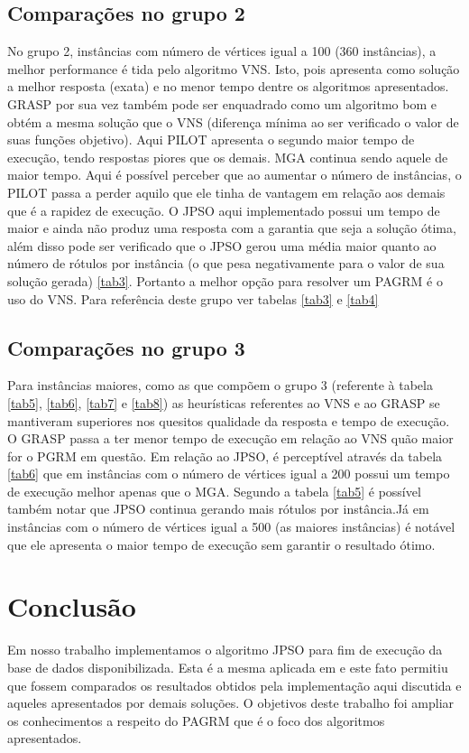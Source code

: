 \documentclass{sig-alternate-05-2015}
\begin{document}
\subsection{Comparações no grupo 2}
        No grupo 2, instâncias com número de vértices igual a 100 (360 instâncias), a melhor performance é tida pelo algoritmo VNS. Isto, pois apresenta como
solução a melhor resposta (exata) e no menor tempo dentre os algoritmos apresentados. GRASP por sua vez também pode ser enquadrado como um algoritmo bom e obtém
a mesma solução que o VNS (diferença mínima ao ser verificado o valor de suas funções objetivo). Aqui PILOT apresenta o segundo maior tempo de execução, tendo respostas piores que os demais. MGA continua sendo aquele de maior tempo.
Aqui é possível perceber que ao aumentar o número de instâncias, o PILOT passa a perder aquilo que ele tinha de vantagem em relação aos demais que é a rapidez
de execução. O JPSO aqui implementado possui um tempo de maior e ainda não produz uma resposta com a garantia que seja a solução ótima, além disso pode ser verificado que o JPSO gerou uma média maior quanto ao número de rótulos por instância (o que pesa negativamente para o valor de sua solução gerada) \ref{tab3}. Portanto a melhor opção
para resolver um PAGRM é o uso do VNS. Para referência deste grupo ver tabelas \ref{tab3} e \ref{tab4}

\subsection{Comparações no grupo 3}
Para instâncias maiores, como as que compõem o grupo 3 (referente à tabela \ref{tab5}, \ref{tab6}, \ref{tab7} e \ref{tab8}) as heurísticas referentes ao VNS e ao GRASP se mantiveram
superiores nos quesitos qualidade da resposta e tempo de execução. O GRASP passa a ter menor tempo de execução em relação ao VNS quão maior for o PGRM em
questão. Em relação ao JPSO, é perceptível através da tabela \ref{tab6} que em instâncias com o número de vértices igual a 200 possui um tempo de execução
melhor apenas que o MGA. Segundo a tabela \ref{tab5} é possível também notar que JPSO continua gerando mais rótulos por instância.Já em instâncias com o número de vértices igual a 500 (as maiores instâncias) é notável que ele apresenta o maior tempo de execução
sem garantir o resultado ótimo.


\section{Conclusão} \label{sec6}
Em nosso trabalho implementamos o algoritmo JPSO para fim de execução da base de dados disponibilizada. Esta é a mesma aplicada em \cite{consoli2009greedy} e
este fato permitiu que fossem comparados os resultados obtidos pela implementação aqui discutida e aqueles apresentados por demais soluções. O objetivos deste
trabalho foi ampliar os conhecimentos a respeito do PAGRM que é o foco dos algoritmos apresentados.
\end{document}
